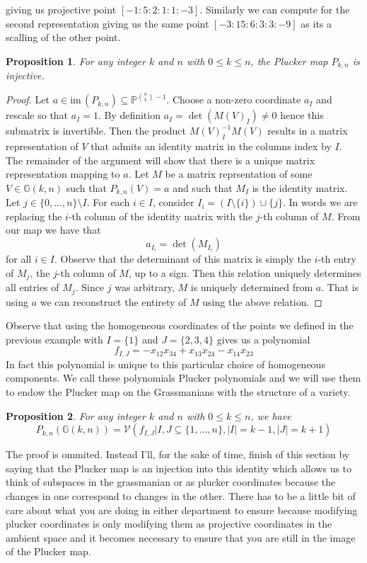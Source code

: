 \documentclass[40pt]{article}
\newcommand{\Proj}{\mathbb{P}}
\newcommand{\G}{\mathbb{G}}
\newcommand{\V}{\mathcal{V}}
\newcommand{\im}{\text{im}\,}
\newtheorem{proposition}{Proposition}[section]
\theoremstyle{remark}
\begin{document}
				giving us projective point $[-1:5:2:1:1:-3]$. Similarly we can compute for the second representation giving us the same point 
				$[-3:15:6:3:3:-9]$ as its a scalling of the other point. 
				\begin{proposition}
					For any integer $k$ and $n$ with $0 \leq k \leq n$, the Plucker map $P_{k,n}$ is injective. 
				\end{proposition}
				\begin{proof}
					Let $a \in \im(P_{k,n}) \subseteq \Proj^{{n \choose k} - 1}$. Choose a non-zero coordinate $a_I$ and rescale so that $a_I = 1$. By definition $a_I = \det(M(V)_I) \neq 0$ hence this submatrix is invertible. Then the product $M(V)_I^{-1}M(V)$ results in a matrix representation of $V$ that admits an identity matrix in the columns index by $I$. The remainder of the argument will show that there is a unique matrix representation mapping to $a$. Let $M$ be a matrix reprsentation of some $V \in \G(k,n)$ such that $P_{k,n}(V) = a$ and such that $M_I$ is the identity matrix. Let $j \in \{0,\dots,n\} \setminus I$. For each $i \in I$, consider $I_i = (I \setminus \{i\}) \cup \{j\}$. In words we are replacing the $i$-th column of the identity matrix with the $j$-th column of $M$. From our map we have that 
					\[
					a_{I_i} = \det(M_{I_i})
					\]
					for all $i \in I$. Observe that the determinant of this matrix is simply the $i$-th entry of $M_j$, the $j$-th column of $M$, up to a sign. Then this relation uniquely determines all entries of $M_j$. Since $j$ was arbitrary, $M$ is uniquely determined from $a$. That is using $a$ we can reconstruct the entirety of $M$ using the above relation. 
				\end{proof}
				Observe that using the homogeneous coordinates of the points we defined in the previous example with $I = \{1\}$ and $J = \{2,3,4\}$ gives us a polynomial 
				\[
				f_{I,J} = -x_{12}x_{34} + x_{13}x_{24} - x_{14}x_{23}
				\]
				In fact this polynomial is unique to this particular choice of homogeneous components. We call these polynomials Plucker polynomials and we will use them to endow the Plucker map on the Grassmanians with the structure of a variety. 
				\begin{proposition}
					For any integer $k$ and $n$ with $0 \leq k \leq n$, we have 
					\[
					P_{k,n}(\G(k,n)) = \V(f_{I,J} | I,J \subseteq \{1,\dots,n\}, |I| = k-1, |J| = k+1)
					\]
				\end{proposition}
				The proof is ommited. Instead I'll, for the sake of time, finish of this section by saying that the Plucker map is an injection into this identity which allows us to think of subspaces in the grassmanian or as plucker coordinates because the changes in one correspond to changes in the other. There has to be a little bit of care about what you are doing in either department to ensure because modifying plucker coordinates is only modifying them as projective coordinates in the ambient space and it becomes necessary to ensure that you are still in the image of the Plucker map. 
\end{document}

